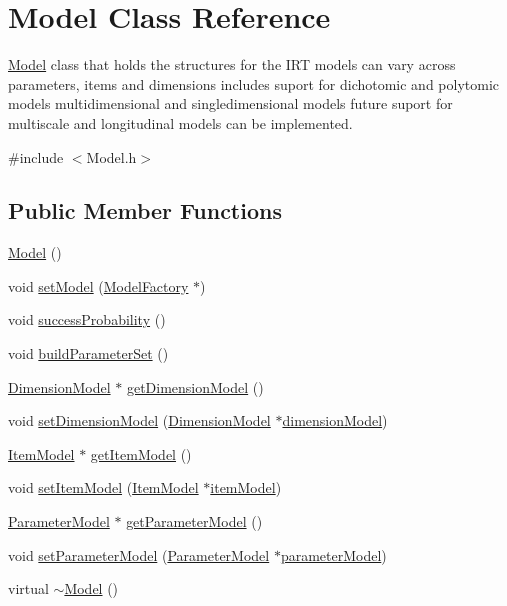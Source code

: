 \hypertarget{classModel}{}\section{Model Class Reference}
\label{classModel}


\hyperlink{classModel}{Model} class that holds the structures for the I\+R\+T models can vary across parameters, items and dimensions includes suport for dichotomic and polytomic models multidimensional and singledimensional models future suport for multiscale and longitudinal models can be implemented.  




{\ttfamily \#include $<$Model.\+h$>$}

\subsection*{Public Member Functions}
\begin{DoxyCompactItemize}
\item 
\hyperlink{classModel_ae3b375de5f6df4faf74a95d64748e048}{Model} ()
\item 
void \hyperlink{classModel_ae45902b145dcab45eaa0809b67aa0ac8}{set\+Model} (\hyperlink{classModelFactory}{Model\+Factory} $\ast$)
\item 
void \hyperlink{classModel_ab6469058eb7c0bf5e14e5d5f2020c0bc}{success\+Probability} ()
\item 
void \hyperlink{classModel_a82cf0120ed0dd2fc0d5637ca93d63f48}{build\+Parameter\+Set} ()
\item 
\hyperlink{classDimensionModel}{Dimension\+Model} $\ast$ \hyperlink{classModel_a19bf0ae24a594e5140fd4a765f951299}{get\+Dimension\+Model} ()
\item 
void \hyperlink{classModel_adb63357558444e8acaefef6f4b5103f7}{set\+Dimension\+Model} (\hyperlink{classDimensionModel}{Dimension\+Model} $\ast$\hyperlink{classModel_aee1e88d3aaf63a2fce339425bbc3be88}{dimension\+Model})
\item 
\hyperlink{classItemModel}{Item\+Model} $\ast$ \hyperlink{classModel_a378677890d8c2ef90efa88a4aa08555e}{get\+Item\+Model} ()
\item 
void \hyperlink{classModel_a9a207633c4de3b0a84421023a5af4568}{set\+Item\+Model} (\hyperlink{classItemModel}{Item\+Model} $\ast$\hyperlink{classModel_aabd14d0c1c8d0c9f20df59d9ecf05e9f}{item\+Model})
\item 
\hyperlink{classParameterModel}{Parameter\+Model} $\ast$ \hyperlink{classModel_a73fa05b38e29e6ec766ec1ddc6af99e4}{get\+Parameter\+Model} ()
\item 
void \hyperlink{classModel_a817f599d0318ac1f4752f49eb5f8e909}{set\+Parameter\+Model} (\hyperlink{classParameterModel}{Parameter\+Model} $\ast$\hyperlink{classModel_a169a32617c83dcbbc03512b9eb7f04fb}{parameter\+Model})
\item 
virtual \hyperlink{classModel_ad6ebd2062a0b823db841a0b88baac4c0}{$\sim$\+Model} ()
\end{DoxyCompactItemize}
